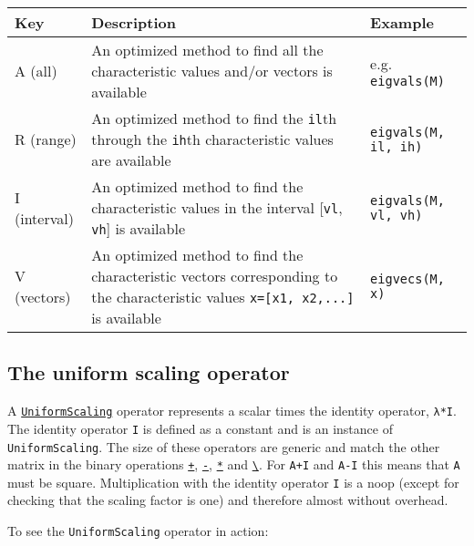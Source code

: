 \begin{table}[h]

\begin{tabulary}{\linewidth}{|L|L|L|}
\hline
Key & Description & Example \\
\hline
A (all) & An optimized method to find all the characteristic values and/or vectors is available & e.g. \texttt{eigvals(M)} \\
\hline
R (range) & An optimized method to find the \texttt{il}th through the \texttt{ih}th characteristic values are available & \texttt{eigvals(M, il, ih)} \\
\hline
I (interval) & An optimized method to find the characteristic values in the interval [\texttt{vl}, \texttt{vh}] is available & \texttt{eigvals(M, vl, vh)} \\
\hline
V (vectors) & An optimized method to find the characteristic vectors corresponding to the characteristic values \texttt{x=[x1, x2,...]} is available & \texttt{eigvecs(M, x)} \\
\hline
\end{tabulary}

\end{table}



\hypertarget{8735142158345502219}{}


\subsection{The uniform scaling operator}



A \hyperlink{723087258311673942}{\texttt{UniformScaling}} operator represents a scalar times the identity operator, \texttt{λ*I}. The identity operator \texttt{I} is defined as a constant and is an instance of \texttt{UniformScaling}. The size of these operators are generic and match the other matrix in the binary operations \hyperlink{3677358729494553841}{\texttt{+}}, \hyperlink{8228207173393714756}{\texttt{-}}, \hyperlink{7592762607639177347}{\texttt{*}} and \hyperlink{4639577998029770435}{\texttt{{\textbackslash}}}. For \texttt{A+I} and \texttt{A-I} this means that \texttt{A} must be square. Multiplication with the identity operator \texttt{I} is a noop (except for checking that the scaling factor is one) and therefore almost without overhead.



To see the \texttt{UniformScaling} operator in action:




